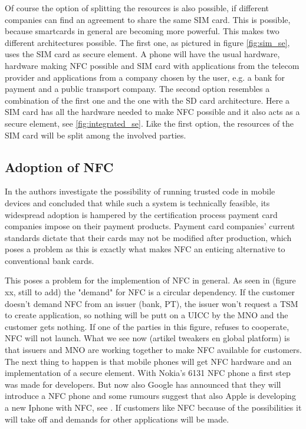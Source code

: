 Of course the option of splitting the resources is also possible, if different companies can find an agreement to share the same SIM card.
This is possible, because smartcards in general are becoming more powerful.
This makes two different architectures possible.
The first one, as pictured in figure \ref{fig:sim_se}, uses the SIM card as secure element.
A phone will have the usual hardware, hardware making NFC possible and SIM card with applications from the telecom provider and applications from a company chosen by the user, e.g. a bank for payment and a public transport company. 
The second option resembles a combination of the first one and the one with the SD card architecture.
Here a SIM card has all the hardware needed to make NFC possible and it also acts as a secure element, see \ref{fig:integrated_se}.
Like the first option, the resources of the SIM card will be split among the involved parties.



\subsection{Adoption of NFC}
In \cite{1497411} the authors investigate the possibility of running trusted code in mobile devices and concluded that while such a system is technically feasible, its widespread adoption is hampered by the certification process payment card companies impose on their payment products.
Payment card companies' current standards dictate that their cards may not be modified after production, which poses a problem as this is exactly what makes NFC an enticing alternative to conventional bank cards.

This poses a problem for the implemention of NFC in general.
As seen in (figure xx, still to add) the "demand" for NFC is a circular dependency.
If the customer doesn't demand NFC from an issuer (bank, PT), the issuer won't request a TSM to create application, so nothing will be putt on a UICC by the MNO and the customer gets nothing.
If one of the parties in this figure, refuses to cooperate, NFC will not launch.
What we see now (artikel tweakers en global platform) is that issuers and MNO are working together to make NFC available for customers.
The next thing to happen is that mobile phones will get NFC hardware and an implementation of a secure element.
With Nokia's 6131 NFC phone a first step was made for developers.
But now also Google has announced that they will introduce a NFC phone and some rumours suggest that also Apple is developing a new Iphone with NFC, see \cite{nu_artikel}.
If customers like NFC because of the possibilities it will take off and demands for other applications will be made. 


